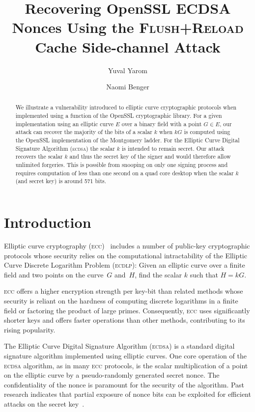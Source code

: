 \documentclass[twocolumn]{svjour3}
\begin{document}
\title{Recovering OpenSSL ECDSA Nonces Using the \textsc{Flush+Reload} Cache Side-channel Attack}
\author{Yuval Yarom \and Naomi Benger}

\maketitle

\begin{abstract}
We illustrate a vulnerability introduced to elliptic curve cryptographic protocols when implemented using a function of the OpenSSL cryptographic library.
For a given implementation using an elliptic curve $E$ over a binary field with a point $G\in E$, our attack can recover the majority of the bits of a scalar $k$ when $kG$ is computed using the OpenSSL implementation of the Montgomery ladder. 
For the Elliptic Curve Digital Signature Algorithm (\textsc{ecdsa}) the scalar $k$ is intended to remain secret. 
Our attack recovers the scalar $k$ and thus the secret key of the signer and would therefore allow unlimited forgeries. 
This is possible from snooping on only one signing process and requires computation of less than one second on a quad core desktop when the scalar $k$ (and secret key) is around 571 bits.

\end{abstract}

\section{Introduction}
Elliptic curve cryptography (\textsc{ecc})~\cite{miller85use,koblitz87elliptic} includes a number of public-key cryptographic protocols whose security relies on the computational intractability of the Elliptic Curve Discrete Logarithm Problem (\textsc{ecdlp}): Given an elliptic curve over a finite field and two points on the curve~$G$ and~$H$, find the scalar $k$ such that $H=kG$.

\textsc{ecc} offers a higher encryption strength per key-bit than related methods whose security is reliant on the hardness of computing discrete logarithms in a finite field or factoring the product of large primes. Consequently, \textsc{ecc} uses significantly shorter keys and offers faster operations than other methods, contributing to its rising popularity.

The Elliptic Curve Digital Signature Algorithm (\textsc{ecdsa}) \cite{johnson01elliptic,fips,ansi962} is a standard
digital signature algorithm implemented using elliptic curves. One core operation of the \textsc{ecdsa} algorithm, as in many \textsc{ecc} protocols, is the scalar multiplication of a point on the elliptic curve by a pseudo-randomly generated secret nonce. The confidentiality of the nonce is paramount for the security of the algorithm. Past research indicates that partial exposure of nonce bits can be exploited for efficient attacks on the secret key~\cite{nguyen03insecurity,brumley11remote}.
\end{document}
